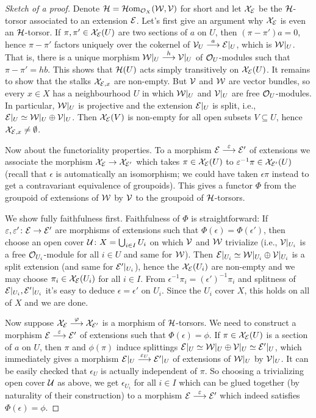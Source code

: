 \documentclass[a4paper,parskip=half,numbers=enddot, DIV=12]{scrreprt}
\begin{document}
\begin{proof}[Sketch of a proof]
	Denote $\mathcal{H}=\operatorname{\mathcal{H} om}_{\mathcal{O}_X}(\mathcal{W},\mathcal{V})$ for short and let $\mathcal{X}_{\mathcal{E}}$ be the $\mathcal{H}$-torsor associated to an extension $\mathcal{E}$. Let's first give an argument why $\mathcal{X}_{\mathcal{E}}$ is even an $\mathcal{H}$-torsor. If $\pi,\pi'\in\mathcal{X}_{\mathcal{E}}(U)$ are two sections of $a$ on $U$, then $(\pi-\pi')a=0$, hence $\pi-\pi'$ factors uniquely over the cokernel of $\Vv_U\morphism[a]\Ee|_U$, which is $\mathcal{W}|_U$. That is, there is a unique morphism $\Ww|_U\morphism[h]\Vv|_U$ of $\mathcal{O}_U$-modules such that $\pi-\pi'=hb$. This shows that $\mathcal{H}(U)$ acts simply transitively on $\mathcal{X}_{\mathcal{E}}(U)$. It remains to show that the stalks $\mathcal{X}_{\mathcal{E},x}$ are non-empty. But $\mathcal{V}$ and $\mathcal{W}$ are vector bundles, so every $x\in X$ has a neighbourhood $U$ in which $\mathcal{W}|_U$ and $\mathcal{V}|_U$ are free $\mathcal{O}_U$-modules. In particular, $\mathcal{W}|_U$ is projective and the extension $\mathcal{E}|_U$ is split, i.e., $\mathcal{E}|_U\simeq \mathcal{W}|_U\oplus \mathcal{V}|_U$. Then $\mathcal{X}_{\mathcal{E}}(V)$ is non-empty for all open subsets $V\subseteq U$, hence $\mathcal{X}_{\mathcal{E},x}\neq \emptyset$.
	
	Now about the functoriality properties. To a morphism $\Ee\morphism[\epsilon]\Ee'$ of extensions we associate the morphism $\Xx_\Ee\morphism\Xx_{\Ee'}$ which takes $\pi\in\mathcal{X}_{\mathcal{E}}(U)$ to $\varepsilon^{-1}\pi\in\mathcal{X}_{\mathcal{E}'}(U)$ (recall that $\epsilon$ is automatically an isomorphism; we could have taken $\epsilon\pi$ instead to get a contravariant equivalence of groupoids). This gives a functor $\Phi$ from the groupoid of extensions of $\mathcal{W}$ by $\mathcal{V}$ to the groupoid of $\mathcal{H}$-torsors. 
	
	We show fully faithfulness first. Faithfulness of $\Phi$ is straightforward: If $\epsilon,\epsilon'\colon \Ee\morphism\Ee'$ are morphisms of extensions such that $\Phi(\epsilon)=\Phi(\epsilon')$, then choose an open cover $\mathcal{U}\colon X=\bigcup_{i\in I}U_i$ on which $\mathcal{V}$ and $\mathcal{W}$ trivialize (i.e., $\mathcal{V}|_{U_i}$ is a free $\mathcal{O}_{U_i}$-module for all $i\in U$ and same for $\mathcal{W}$). Then $\mathcal{E}|_{U_i}\simeq \mathcal{W}|_{U_i}\oplus \mathcal{V}|_{U_i}$ is a split extension (and same for $\mathcal{E}'|_{U_i}$), hence the $\mathcal{X}_{\mathcal{E}}(U_i)$ are non-empty and we may choose $\pi_i\in \mathcal{X}_{\mathcal{E}}(U_i)$ for all $i\in I$. From $\epsilon^{-1}\pi_i=(\epsilon')^{-1}\pi_i$ and splitness of $\mathcal{E}|_{U_i},\mathcal{E}'|_{U_i}$ it's easy to deduce $\epsilon=\epsilon'$ on $U_i$. Since the $U_i$ cover $X$, this holds on all of $X$ and we are done.
	
	Now suppose $\Xx_\Ee\morphism[\phi]\Xx_{\Ee'}$ is a morphism of $\mathcal{H}$-torsors. We need to construct a morphism $\Ee\morphism[\epsilon]\Ee'$ of extensions such that $\Phi(\epsilon)=\phi$. If $\pi\in\mathcal{X}_{\mathcal{E}}(U)$ is a section of $a$ on $U$, then $\pi$ and $\phi(\pi)$ induce splittings $\mathcal{E}|_U\simeq \mathcal{W}|_U\oplus\mathcal{V}|_U\simeq \mathcal{E}'|_U$, which immediately gives a morphism $\Ee|_U\morphism[\epsilon_U]\Ee'|_U$ of extensions of $\mathcal{W}|_U$ by $\mathcal{V}|_U$. It can be easily checked that $\epsilon_U$ is actually independent of $\pi$. So choosing a trivializing open cover $\mathcal{U}$ as above, we get $\epsilon_{U_i}$ for all $i\in I$ which can be glued together (by naturality of their construction) to a morphism $\Ee\morphism[\epsilon]\Ee'$ which indeed satisfies $\Phi(\epsilon)=\phi$.
	

\end{proof}
\end{document}
